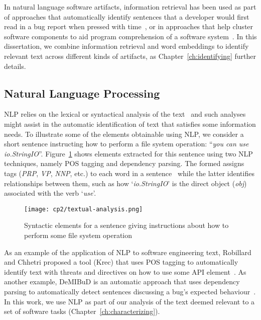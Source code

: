 
In natural language software artifacts, 
information retrieval has been used 
as part of approaches that
automatically identify sentences  that a developer would first read in a bug report 
when pressed with time~\cite{Lotufo2012},
or in approaches that help cluster software components to aid program comprehension of a software system~\cite{Marcus2003}.
In this dissertation, we combine information retrieval and word embeddings 
to identify relevant text across different kinds of artifacts, as Chapter~\ref{ch:identifying} further details.



\subsection{Natural Language Processing }
\label{cp2:nlp}


\acf{NLP} relies on the lexical or syntactical analysis of the text~\cite{jurafsky2014speech}
and such analyses might assist in the automatic identification of text that satisfies some information needs. 
To illustrate some of the elements obtainable using \acs{NLP}, we consider a short sentence 
instructing how to perform a file system operation: ``\textit{you can use io.StringIO}''.
Figure~\ref{fig:nlp-analysis} shows elements extracted for this sentence using two \acs{NLP} techniques,
namely \acf{POS} tagging and dependency parsing.
The formed assigns tags  ({\small \textit{PRP}, \textit{VP}, \textit{NNP},} etc.) to each word 
in a sentence~\cite{taylor2003penn} while the latter identifies
relationships between them, such as how 
`\textit{io.StringIO}' is the direct object (\textit{obj})
associated with the verb `\textit{use}'.



\medskip
\begin{figure}[h!]
    \centering
    \texttt{[image: cp2/textual-analysis.png]}
    \caption{Syntactic elements for a sentence giving instructions about how to perform some file system operation}
    \label{fig:nlp-analysis}
\end{figure}


As an example of the application of \ac{NLP} to software engineering text,
Robillard  and Chhetri proposed a tool (Krec)
that uses \acs{POS} tagging to automatically 
identify text with threats and directives on how to use some API element~\cite{Robillard2015}.
As another example, {\small DeMIBuD}
is an automatic approach that uses dependency parsing
to automatically detect sentences discussing a bug's expected behaviour~\cite{Chaparro2017}.
In this work, we use \acs{NLP} as part of our 
analysis of the text deemed relevant to a set of software tasks (Chapter~\ref{ch:characterizing}).



